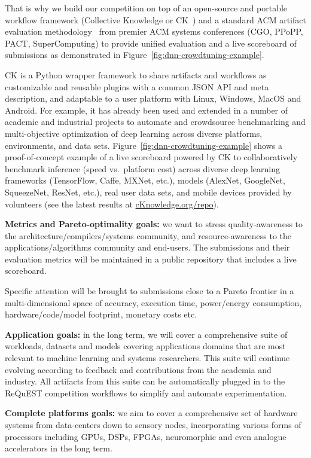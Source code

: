 \documentclass[10pt,letterpaper,twocolumn]{article}
\begin{document}
That is why we build our competition on top of an open-source 
and portable workflow framework (Collective Knowledge or CK~\cite{ck-date16})
and a standard ACM artifact evaluation methodology~\cite{ctuning-ae} 
from premier ACM systems conferences (CGO, PPoPP, PACT, SuperComputing) 
to provide unified evaluation and a live scoreboard of submissions
as demonstrated in Figure~\ref{fig:dnn-crowdtuning-example}. 

CK is a Python wrapper framework to share artifacts and workflows 
as customizable and reusable plugins with a common JSON API and meta description,
and adaptable to a user platform with Linux, Windows, MacOS and Android.
%
For example, it has already been used and extended in a number of academic and industrial projects
to automate and crowdsource benchmarking and multi-objective optimization of deep learning
across diverse platforms, environments, and data sets.
%
Figure~\ref{fig:dnn-crowdtuning-example} shows a proof-of-concept example of a live scoreboard 
powered by CK to collaboratively benchmark inference (speed vs.\ platform cost) 
across diverse deep learning frameworks (TensorFlow, Caffe, MXNet, etc.), 
models (AlexNet, GoogleNet, SqueezeNet, ResNet, etc.), real user data sets, and mobile devices 
provided by volunteers (see the latest results at \href{http://cknowledge.org/repo}{cKnowledge.org/repo}).

\textbf{Metrics and Pareto-optimality goals:} we want to stress
quality-awareness to the architecture/compilers/systems community,
and resource-awareness to the applications/algorithms community and
end-users. The submissions and their evaluation metrics will
be maintained in a public repository that includes a live
scoreboard. 

Specific attention will be brought to submissions 
close to a Pareto frontier in a multi-dimensional 
space of accuracy, execution time, power/energy consumption, 
hardware/code/model footprint, monetary costs etc.

\textbf{Application goals:} in the long term, we will
cover a comprehensive suite of workloads, datasets and models
covering applications domains that are most relevant
to machine learning and systems researchers. 
This suite will continue evolving according 
to feedback and contributions from the academia and industry.
All artifacts from this suite can be automatically plugged 
in to the ReQuEST competition workflows to simplify and automate 
experimentation.

\textbf{Complete platforms goals:} we aim to cover
a comprehensive set of hardware systems from data-centers down
to sensory nodes, incorporating various forms of processors
including GPUs, DSPs, FPGAs, neuromorphic and even analogue
accelerators in the long term.
\end{document}
